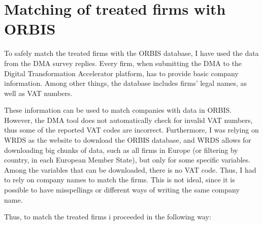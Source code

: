\documentclass[12pt]{report}
\begin{document}
\newpage
\section{Matching of treated firms with ORBIS}

\par To safely match the treated firms with the ORBIS database, I have used the data from the DMA survey replies. Every firm, when submitting the DMA to the Digital Transformation Accelerator platform, has to provide basic company information. Among other things, the database includes firms' legal names, as well as VAT numbers. 

\par These information can be used to match companies with data in ORBIS. However, the DMA tool does not automatically check for invalid VAT numbers, thus some of the reported VAT codes are incorrect. Furthermore, I was relying on WRDS as the website to download the ORBIS database, and WRDS allows for downloading big chunks of data, such as all firms in Europe (or filtering by country, in each European Member State), but only for some specific variables. Among the variables that can be downloaded, there is no VAT code. Thus, I had to rely on company names to match the firms. This is not ideal, since it is possible to have misspellings or different ways of writing the same company name.

\par Thus, to match the treated firms i proceeded in the following way:
\end{document}
